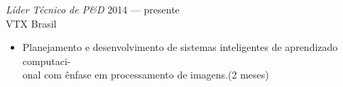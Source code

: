 \documentclass[]{res} %
\newcommand{\sbt}{\,\begin{picture}(-1,1)(-2,-3)\circle*{2}\end{picture}\ }
\def \myitemback{0.55cm}
\def \myitemsep{0pt}
\def \mypositionface{\sl}
\def \myorgface{\sc}
\begin{document}
\begin{resume}
{\mypositionface Líder Técnico de P\&D} \hfill 2014 — presente \\
{\myorgface VTX Brasil}

\begin{itemize}[itemsep=\myitemsep,leftmargin=\myitemback]
\item[\sbt] Planejamento e desenvolvimento de sistemas inteligentes de aprendizado computaci-\\onal com ênfase em processamento de imagens.\hfill(2 meses)
\end{itemize}



 




\end{resume}
\end{document}
